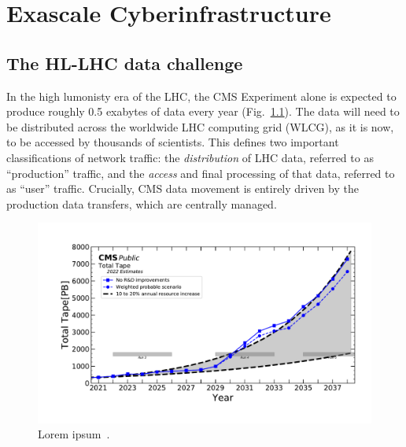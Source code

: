 \chapter{Exascale Cyberinfrastructure}\label{ch:cyber}

\section{The HL-LHC data challenge}
In the high lumonisty era of the LHC, the CMS Experiment alone is expected to produce roughly 0.5 exabytes of data every year\footnotemark{} (Fig.~\ref{fig:tape_projections}). 
The data will need to be distributed across the worldwide LHC computing grid (WLCG), as it is now, to be accessed by thousands of scientists. 
This defines two important classifications of network traffic: the \textit{distribution} of LHC data, referred to as ``production'' traffic, and the \textit{access} and final processing of that data, referred to as ``user'' traffic. 
Crucially, CMS data movement is entirely driven by the production data transfers, which are centrally managed. 

\begin{figure}[htb]
  \centering
  \includegraphics[width=.9\textwidth]{fig/cyber/tape_cms2022.pdf}
  \caption{Lorem ipsum~\cite{CMSComputingReport2022}.}
  \label{fig:tape_projections}
\end{figure}

